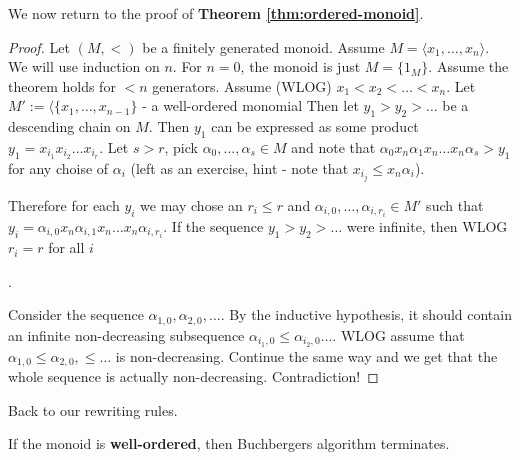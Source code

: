 \smallLine
We now return to the proof of \textbf{Theorem \ref{thm:ordered-monoid}}.
\begin{proof}
    Let $(M, <)$ be a finitely generated monoid.
    Assume $M = \langle{x_1,\ldots, x_n}\rangle$.
    We will use induction on $n$.
    For $n=0$, the monoid is just $M = \{1_M\}$.
    Assume the theorem holds for $<n$ generators.
    Assume (WLOG) $x_1< x_2 < \ldots < x_n$.
    Let $M' := \langle\{x_1,\ldots, x_{n-1}\}$ - a well-ordered monomial
    Then let $y_1 > y_2 > \ldots $ be a descending chain on $M$.
    Then $y_1$ can be expressed as some product 
    $y_1 = x_{i_1}x_{i_2}\ldots x_{i_{r}}$.
    Let $s > r$, pick $\alpha_0, \ldots, \alpha_s \in M$ 
    and note that $\alpha_0 x_n \alpha_1 x_n \ldots x_n\alpha_s > y_1$
    for any choise of $\alpha_i$ (left as an exercise,
    hint - note that $x_{i_j} \leq x_n \alpha_i$).

    Therefore for each $y_i$ we may chose 
    an $r_i \leq r$ and $\alpha_{i, 0}, \ldots, \alpha_{i, r_i} \in M'$
    such that $y_i = \alpha_{i,0}x_n \alpha_{i, 1}x_n \ldots x_n\alpha_{i, r_i}$.
    If the sequence $y_1 > y_2 > \ldots$ were infinite, 
    then WLOG $r_i = r$ for all $i$ 

    .

    Consider the sequence $\alpha_{1, 0}, \alpha_{2, 0}, \ldots$.
    By the inductive hypothesis, it should contain an infinite 
    non-decreasing subsequence
    $\alpha_{i_1, 0} \leq \alpha_{i_2, 0} \ldots$.
    WLOG assume that $\alpha_{1, 0}\leq  \alpha_{2, 0}, \leq \ldots $
    is non-decreasing.
    Continue the same way and we get that the whole sequence is actually
    non-decreasing. Contradiction!    

\end{proof}

Back to our rewriting rules. 
\begin{Theorem}
If the monoid is \textbf{well-ordered}, then Buchbergers algorithm
terminates. 
\end{Theorem}

